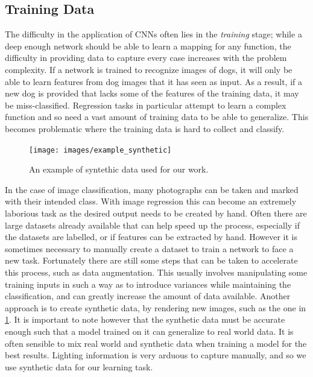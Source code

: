 \documentclass[ %
                    author={Gavin Parker},
                supervisor={Dr. Neill Campbell},
                    degree={MEng},
                     title={Deep Learning for Illumination Estimation from Stereo Images},
                  subtitle={},
                      type={Research},
                      year={2018} ]{dissertation}
\begin{document}
\subsection{Training Data}
The difficulty in the application of CNNs often lies in the \textit{training} stage; while a deep enough network should be able to learn a mapping for any function, the difficulty in providing data to capture every case increases with the problem complexity. If a network is trained to recognize images of dogs, it will only be able to learn features from dog images that it has seen as input. As a result, if a new dog is provided that lacks some of the features of the training data, it may be miss-classified. Regression tasks in particular attempt to learn a complex function and so need a vast amount of training data to be able to generalize. This becomes problematic where the training data is hard to collect and classify.
\begin{figure}
\texttt{[image: images/example\_synthetic]}
\centering
\caption{An example of syntethic data used for our work.}
\label{fig:synth}
\end{figure}
In the case of image classification, many photographs can be taken and marked with their intended class. With image regression this can become an extremely laborious task as the desired output needs to be created by hand. Often there are large datasets already available that can help speed up the process, especially if the datasets are labelled, or if features can be extracted by hand. However it is sometimes necessary to manually create a dataset to train a network to face a new task. Fortunately there are still some steps that can be taken to accelerate this process, such as data augmentation. This usually involves manipulating some training inputs in such a way as to introduce variances while maintaining the classification, and can greatly increase the amount of data available.
Another approach is to create synthetic data, by rendering new images, such as the one in \ref{fig:synth}. It is important to note however that the synthetic data must be accurate enough such that a model trained on it can generalize to real world data. It is often sensible to mix real world and synthetic data when training a model for the best results. Lighting information is very arduous to capture manually, and so we use synthetic data for our learning task.

\end{document}

